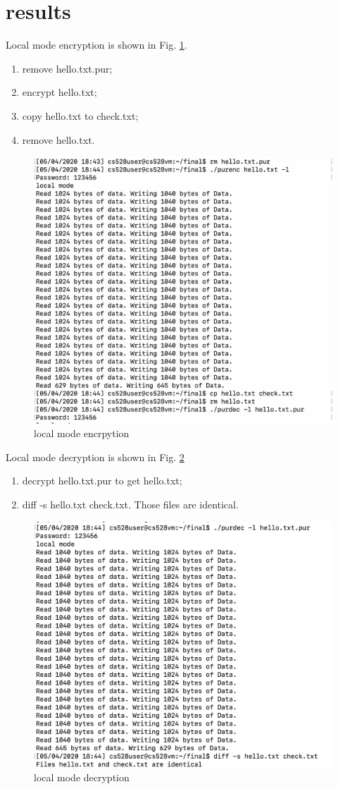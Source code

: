 \documentclass[11pt, oneside]{article}   	%
\begin{document}
\section{results}
Local mode encryption is shown in Fig. \ref{fig1}. 
\begin{enumerate}
\item remove hello.txt.pur; 
\item encrypt hello.txt;
\item copy hello.txt to check.txt;
\item remove hello.txt.
\end{enumerate}
\begin{figure}[htbp]
   \centering
   \includegraphics[scale = 0.7]{local1.png} %
   \caption{local mode encrpytion}
   \label{fig1}
\end{figure}

Local mode decryption is shown in Fig. \ref{fig2}
\begin{enumerate}
\item decrypt hello.txt.pur to get hello.txt;
\item diff -s hello.txt check.txt. Those files are identical.
\end{enumerate}

\begin{figure}[htbp]
   \centering
   \includegraphics[scale = 0.7]{local2.png} %
   \caption{local mode decryption}
   \label{fig2}
\end{figure}
\end{document}
